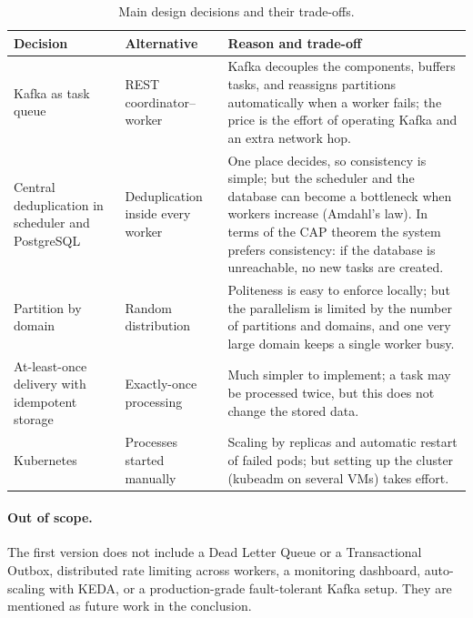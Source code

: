 \begin{table}[H]
\centering
\begin{tabular}{|p{2.9cm}|p{3.0cm}|p{7.5cm}|}
\hline
\textbf{Decision} & \textbf{Alternative} & \textbf{Reason and trade-off} \\
\hline
Kafka as task queue & REST coordinator--worker & Kafka decouples the components, buffers tasks, and reassigns partitions automatically when a worker fails; the price is the effort of operating Kafka and an extra network hop. \\
\hline
Central deduplication in scheduler and PostgreSQL & Deduplication inside every worker & One place decides, so consistency is simple; but the scheduler and the database can become a bottleneck when workers increase (Amdahl's law). In terms of the CAP theorem the system prefers consistency: if the database is unreachable, no new tasks are created. \\
\hline
Partition by domain & Random distribution & Politeness is easy to enforce locally; but the parallelism is limited by the number of partitions and domains, and one very large domain keeps a single worker busy. \\
\hline
At-least-once delivery with idempotent storage & Exactly-once processing & Much simpler to implement; a task may be processed twice, but this does not change the stored data. \\
\hline
Kubernetes & Processes started manually & Scaling by replicas and automatic restart of failed pods; but setting up the cluster (kubeadm on several VMs) takes effort. \\
\hline
\end{tabular}
\caption{Main design decisions and their trade-offs.}
\label{tab:decisions}
\end{table}

\paragraph{Out of scope.} The first version does not include a Dead Letter Queue or a Transactional Outbox, distributed rate limiting across workers, a monitoring dashboard, auto-scaling with KEDA, or a production-grade fault-tolerant Kafka setup. They are mentioned as future work in the conclusion.










